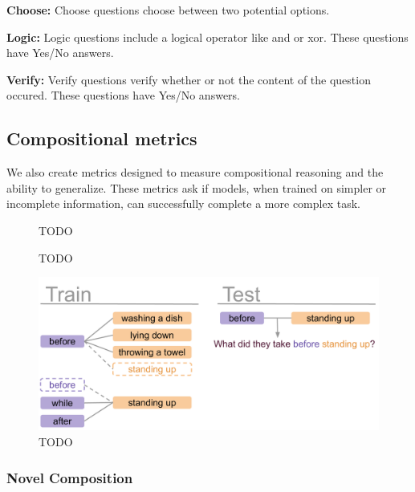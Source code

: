 \documentclass[10pt,twocolumn,letterpaper]{article}
\begin{document}
\textbf{Choose: } Choose questions choose between two potential options. 

\textbf{Logic: } Logic questions include a logical operator like and or xor. These questions have Yes/No answers. 

\textbf{Verify: } Verify questions verify whether or not the content of the question occured. These questions have Yes/No answers.



\subsection{Compositional metrics}

We also create metrics designed to measure compositional reasoning and the ability to generalize. These metrics ask if models, when trained on simpler or incomplete information, can successfully complete a more complex task.


\begin{figure}[t]
\begin{center}

\end{center}
   \caption{TODO}
\label{compo results}
\end{figure}


\begin{figure}[t]
\begin{center}
\resizebox{\linewidth}{!}{

}
\end{center}
   \caption{TODO}
\label{global results}
\end{figure}


\begin{figure}[t]
    \centering
    \includegraphics[width=0.95\linewidth]{figures/novel comp.pdf}
    \caption{TODO}
    \label{fig:compo}
\end{figure}


\subsubsection{Novel Composition}
\end{document}
